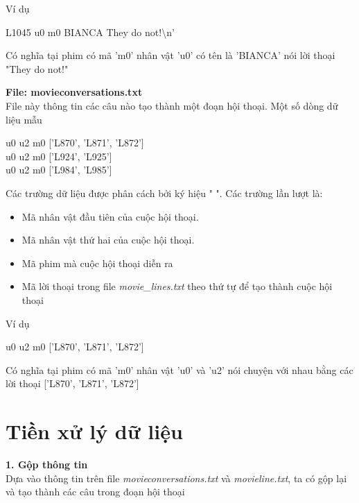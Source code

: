 Ví dụ
\begin{displayquote}
L1045 \detokenize{+++\$+++} u0 \detokenize{+++\$+++} m0 \detokenize{+++\$+++} BIANCA \detokenize{+++\$+++} They do not!\textbackslash{}n' \\
\end{displayquote}
Có nghĩa tại phim có mã 'm0' nhân vật 'u0' có tên là 'BIANCA' nói lời thoại "They do not!"

\textbf{File: movie\detokenize{_}conversations.txt} \\
File này thông tin các câu nào tạo thành một đoạn hội thoại. Một số dòng dữ liệu mẫu
\begin{displayquote}
    u0 \detokenize{+++\$+++} u2 \detokenize{+++\$+++} m0 \detokenize{+++\$+++} ['L870', 'L871', 'L872'] \\
    u0 \detokenize{+++\$+++} u2 \detokenize{+++\$+++} m0 \detokenize{+++\$+++} ['L924', 'L925'] \\
    u0 \detokenize{+++\$+++} u2 \detokenize{+++\$+++} m0 \detokenize{+++\$+++} ['L984', 'L985'] \\
\end{displayquote}
Các trường dữ liệu được phân cách bởi ký hiệu "\detokenize{+++\$+++} ".
Các trường lần lượt là:
\begin{itemize}
    \item Mã nhân vật đầu tiên của cuộc hội thoại.
    \item Mã nhân vật thứ hai của cuộc hội thoại.
    \item Mã phim mà cuộc hội thoại diễn ra
    \item Mã lời thoại trong file \textit{movie\_lines.txt} theo thứ tự để tạo thành cuộc hội thoại
\end{itemize}

Ví dụ
\begin{displayquote}
    u0 \detokenize{+++\$+++} u2 \detokenize{+++\$+++} m0 \detokenize{+++\$+++} ['L870', 'L871', 'L872']
\end{displayquote}
Có nghĩa tại phim có mã 'm0' nhân vật 'u0' và 'u2' nói chuyện với nhau bằng các lời thoại ['L870', 'L871', 'L872']

\section{Tiền xử lý dữ liệu}
\textbf{1. Gộp thông tin} \\
Dựa vào thông tin trên file \textit{movie\detokenize{_}conversations.txt} và \textit{movie\detokenize{_}line.txt}, ta có gộp lại và tạo thành
các câu trong đoạn hội thoại

